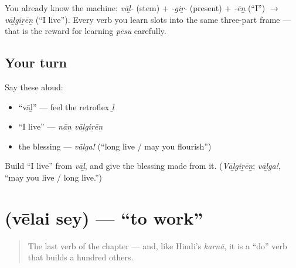\begin{grammarlens}[title={Grammar Lens: same engine, new verb}]
You already know the machine: \emph{vāḻ-} (stem) + \emph{-giṟ-} (present) + \emph{-ēṉ} (\textquotedblleft{}I\textquotedblright{}) $\to$ \emph{vāḻgiṟēṉ} (\textquotedblleft{}I live\textquotedblright{}). Every verb you learn slots into the same three-part frame — that is the reward for learning \emph{pēsu} carefully.
\end{grammarlens}

\subsection*{Your turn}
Say these aloud:

\begin{itemize}
\raggedright
  \item \textquotedblleft{}vāḻ\textquotedblright{} — feel the retroflex \emph{ḻ}
  \item \textquotedblleft{}I live\textquotedblright{} — \emph{nāṉ vāḻgiṟēṉ}
  \item the blessing — \emph{vāḻga!} (\textquotedblleft{}long live / may you flourish\textquotedblright{})
\end{itemize}

\begin{tcolorbox}[breakable,colback=teal!4,colframe=teal!35!black,title={Before you move on}]
Build \textquotedblleft{}I live\textquotedblright{} from \emph{vāḻ}, and give the blessing made from it. (\emph{Vāḻgiṟēṉ}; \emph{vāḻga!}, \textquotedblleft{}may you live / long live.\textquotedblright{})
\end{tcolorbox}
\section[\texorpdfstring{\ta{வேலை} \ta{செய்} (vēlai sey)}{வேலை செய் (vēlai sey)}]{  (vēlai sey) — \textquotedblleft{}to work\textquotedblright{}}

\label{lesson:TA-C05-velai-sey}



\begin{quote}
The last verb of the chapter — and, like Hindi's \emph{karnā}, it is a \textquotedblleft{}do\textquotedblright{} verb that builds a hundred others.
\end{quote}

